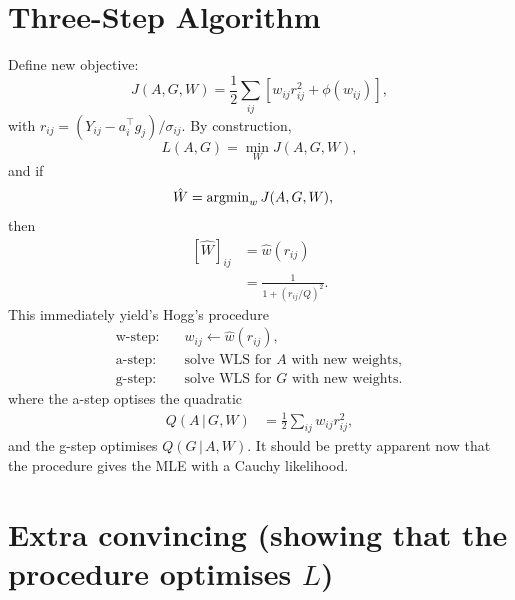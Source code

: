 \documentclass[11pt]{article}
\begin{document}
\section*{Three-Step Algorithm}

Define new objective:
\begin{equation}
    J(A,G,W) = \frac{1}{2}\sum_{ij} \left[ w_{ij} r_{ij}^2 + \phi(w_{ij}) \right],
\end{equation}
with $r_{ij} = (Y_{ij} - a_i^\top g_j)/\sigma_{ij}$.
By construction,
\begin{equation}
    L(A,G) = \min_W J(A,G,W),
\end{equation}
and if
\begin{align}
    \hat{W} &= {\rm argmin}_w \, J(A, G, W),
\end{align}
then
\begin{align}
    \left[ \hat{W} \right]_{ij} &= \hat{w} (r_{ij}) \\
    &= \frac{1}{1 + (r_{ij} / Q)^2}.
\end{align}
This immediately yield's Hogg's procedure
\begin{align*}
    \text{w-step:} \quad & w_{ij} \leftarrow \hat{w}(r_{ij}), \\
    \text{a-step:} \quad & \text{solve WLS for $A$ with new weights}, \\
    \text{g-step:} \quad & \text{solve WLS for $G$ with new weights}.
\end{align*}
where the a-step optises the quadratic
\begin{align}
    Q(A \, | \, G, W) &= \frac{1}{2} \sum_{ij} w_{ij} r_{ij}^2,
\end{align}
and the g-step optimises $Q(G \, | \, A, W)$.
It should be pretty apparent now that the procedure gives the MLE with a Cauchy likelihood.

\section*{Extra convincing (showing that the procedure optimises $L$)}
\end{document}
